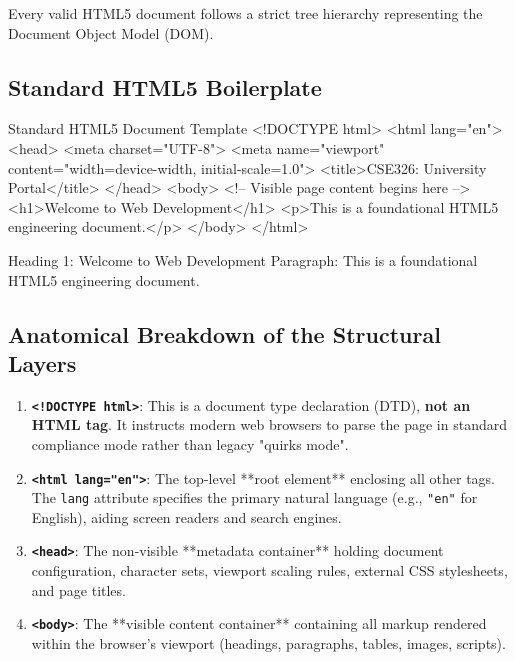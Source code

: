 Every valid HTML5 document follows a strict tree hierarchy representing the Document Object Model (DOM).

\subsection{Standard HTML5 Boilerplate}
\begin{htmlcode}{Standard HTML5 Document Template}
<!DOCTYPE html>
<html lang="en">
<head>
    <meta charset="UTF-8">
    <meta name="viewport" content="width=device-width, initial-scale=1.0">
    <title>CSE326: University Portal</title>
</head>
<body>
    <!-- Visible page content begins here -->
    <h1>Welcome to Web Development</h1>
    <p>This is a foundational HTML5 engineering document.</p>
</body>
</html>
\end{htmlcode}

\begin{outputbox}
Heading 1: Welcome to Web Development
Paragraph: This is a foundational HTML5 engineering document.
\end{outputbox}

\subsection{Anatomical Breakdown of the Structural Layers}
\begin{enumerate}[leftmargin=1.5em]
    \item \textbf{\texttt{<!DOCTYPE html>}}: This is a document type declaration (DTD), \textbf{not an HTML tag}. It instructs modern web browsers to parse the page in standard compliance mode rather than legacy "quirks mode".
    \item \textbf{\texttt{<html lang="en">}}: The top-level **root element** enclosing all other tags. The \texttt{lang} attribute specifies the primary natural language (e.g., \texttt{"en"} for English), aiding screen readers and search engines.
    \item \textbf{\texttt{<head>}}: The non-visible **metadata container** holding document configuration, character sets, viewport scaling rules, external CSS stylesheets, and page titles.
    \item \textbf{\texttt{<body>}}: The **visible content container** containing all markup rendered within the browser's viewport (headings, paragraphs, tables, images, scripts).
\end{enumerate}

